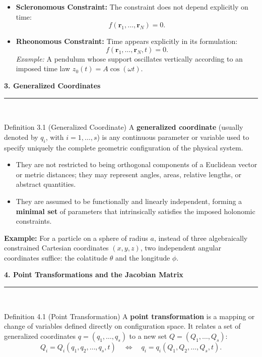 \documentclass[11pt,letterpaper]{article}
\newcommand{\manualsection}[1]{%
  \vspace{0.35cm}
  {\Large\bfseries\color{darkslate} #1}\\[2pt]
  {\color{tealmain!70}\rule{\linewidth}{1.2pt}}\\[0.25cm]
}
\newcommand{\term}[1]{\textbf{\color{tealmain}#1}}
\newcommand{\termb}[1]{\textbf{\color{darkforest}#1}}
\begin{document}
\begin{itemize}
    \item \textbf{Scleronomous Constraint:} The constraint does not depend explicitly on time:
    \begin{equation}
        f(\mathbf{r}_1, \dots, \mathbf{r}_N) = 0.
    \end{equation}
    \item \textbf{Rheonomous Constraint:} Time appears explicitly in its formulation:
    \begin{equation}
        f(\mathbf{r}_1, \dots, \mathbf{r}_N, t) = 0.
    \end{equation}
    \textit{Example:} A pendulum whose support oscillates vertically according to an imposed time law $z_0(t) = A\cos(\omega t)$.
\end{itemize}

\manualsection{3. Generalized Coordinates}

\begin{infobox}[pinkmain]{Definition 3.1 (Generalized Coordinate)}
A \term{generalized coordinate} (usually denoted by $q_i$, with $i = 1, \dots, s$) is any continuous parameter or variable used to specify uniquely the complete geometric configuration of the physical system.
\begin{itemize}
    \item They are not restricted to being orthogonal components of a Euclidean vector or metric distances; they may represent angles, areas, relative lengths, or abstract quantities.
    \item They are assumed to be functionally and linearly independent, forming a \textbf{minimal set} of parameters that intrinsically satisfies the imposed holonomic constraints.
\end{itemize}
\end{infobox}

\noindent\textbf{Example:} For a particle on a sphere of radius $a$, instead of three algebraically constrained Cartesian coordinates $(x,y,z)$, two independent angular coordinates suffice: the colatitude $\theta$ and the longitude $\phi$.


\manualsection{4. Point Transformations and the Jacobian Matrix}

\begin{infobox}[purplesec]{Definition 4.1 (Point Transformation)}
A \termb{point transformation} is a mapping or change of variables defined directly on configuration space. It relates a set of generalized coordinates $q = (q_1, \dots, q_s)$ to a new set $Q = (Q_1, \dots, Q_s)$:
\begin{equation}
    Q_i = Q_i(q_1, q_2, \dots, q_s, t) \quad \Longleftrightarrow \quad q_i = q_i(Q_1, Q_2, \dots, Q_s, t).
\end{equation}
\end{infobox}
\end{document}

